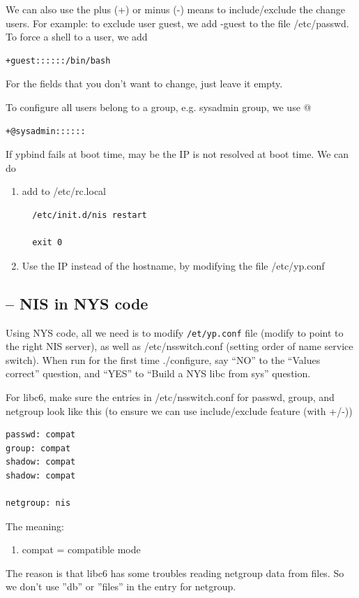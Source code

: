 We can also  use the plus (+) or minus (-)
means to include/exclude the change users. For example: to exclude user guest,
we add -guest to the file /etc/passwd. To force a shell to a user, we add
\begin{verbatim}
+guest::::::/bin/bash
\end{verbatim}
For the fields that you don't want to change, just leave it empty.


To configure all users belong to a group, e.g. sysadmin group, we use @ 
\begin{verbatim}
+@sysadmin::::::
\end{verbatim}

If ypbind fails at boot time, may be the IP is not resolved at boot time. We can
do
\begin{enumerate}
  \item add to /etc/rc.local
  \begin{verbatim}
  /etc/init.d/nis restart
  
  exit 0
  \end{verbatim}
  \item Use the IP instead of the hostname, by modifying the file /etc/yp.conf
\end{enumerate}
  
\subsection{-- NIS in NYS code}
\label{sec:NYS_code}

Using NYS code, all we need is to modify \verb!/et/yp.conf! file (modify to
point to the right NIS server), as well as /etc/nsswitch.conf (setting order
of name service switch).  When run for the first time ./configure, say ``NO'' to
the ``Values correct'' question, and ``YES'' to ``Build a NYS libc from sys'' question.


For libc6, make sure the entries in /etc/nsswitch.conf for passwd, group, and
netgroup look like this (to ensure we can use include/exclude feature (with
+/-))
\begin{verbatim}
passwd: compat
group: compat
shadow: compat
shadow: compat

netgroup: nis
\end{verbatim}
The meaning:
\begin{enumerate}
  \item compat = compatible mode
\end{enumerate}
The reason is that libc6 has some troubles reading netgroup data from files. So
we don't use ''db'' or ''files'' in the entry for netgroup. 

